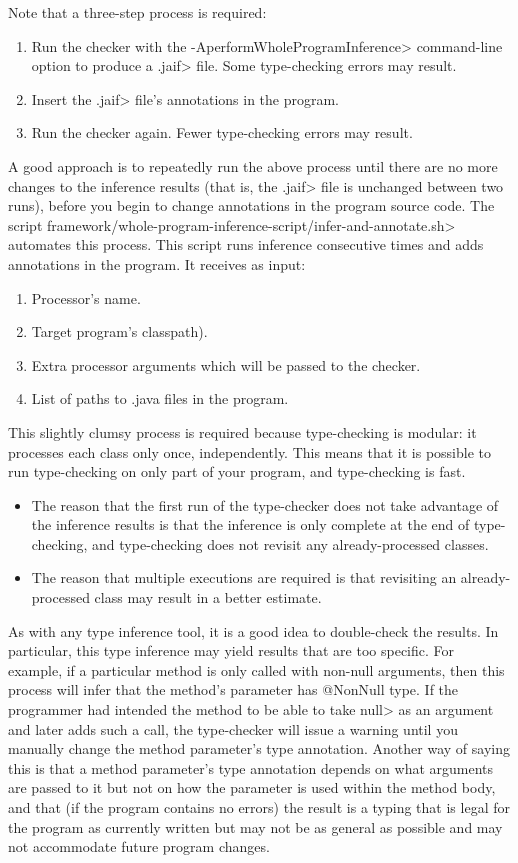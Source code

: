 Note that a three-step process is required:
\begin{enumerate}
\item Run the checker with the \<-AperformWholeProgramInference> command-line option to
  produce a \<.jaif> file.  Some type-checking errors may result.
\item Insert the \<.jaif> file's annotations in the program.
\item Run the checker again.  Fewer type-checking errors may result.
\end{enumerate}
\noindent
A good approach is to repeatedly run the above process until there are no
more changes to the inference results (that is, the \<.jaif> file is
unchanged between two runs), before you begin to change annotations in the
program source code.
The script \<framework/whole-program-inference-script/infer-and-annotate.sh>
automates this process. This script runs inference consecutive times and adds
annotations in the program. It receives as input:
\begin{enumerate}
\item Processor's name.
\item Target program's classpath).
\item Extra processor arguments which will be passed to the checker.
\item List of paths to .java files in the program.
\end{enumerate}

This slightly clumsy process is required because type-checking is modular:
it processes each class only once, independently.  This means that it is
possible to run type-checking on only part of your program, and
type-checking is fast.
\begin{itemize}
\item
  The reason that the first run of the type-checker does not take advantage
  of the inference results is that the inference is only complete at the
  end of type-checking, and type-checking does not revisit any
  already-processed classes.
\item
  The reason that multiple executions are required is that revisiting an
  already-processed class may result in a better estimate.
\end{itemize}

As with any type inference tool, it is a good idea to double-check the
results.  In particular, this type inference may yield results that are too
specific.  For example, if a particular method is only called with non-null
arguments, then this process will infer that the method's parameter has
@NonNull type.  If the programmer had intended the method to be able to
take \<null> as an argument and later adds such a call, the type-checker
will issue a warning until you manually change the method parameter's type
annotation.  Another way of saying this is that a method parameter's type
annotation depends on what arguments are passed to it but not on how the
parameter is used within the method body, and that (if the program contains
no errors) the result is a typing that is legal for the program as
currently written but may not be as general as possible and may not
accommodate future program changes.

